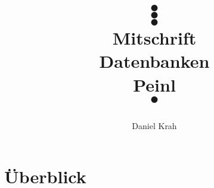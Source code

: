 \documentclass{article}
\title{
\color{white}
 $\bullet$ \\ $\bullet$ \\ $\bullet$ \\
 \color{black}
 \color{black}
 Mitschrift \\
Datenbanken \\
Peinl \\
\color{white}
$\bullet$ \\
\color{black}
 \begin{center}
\end{center}
}
\author{Daniel Krah}
\begin{document}
\maketitle%
\newpage%
 \tableofcontents%



%
% 







% 
\newpage
\section{Überblick}



% 
% 



% 
% 
% 
% 

% 




% 
% 
% 
% 
% 
% 


% 






% 
% 
% 
% 
% 
% 
% 




%
\end{document}
